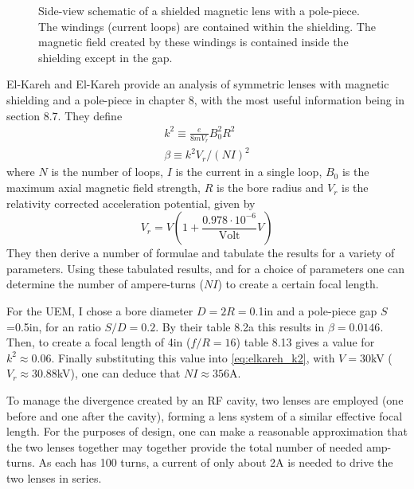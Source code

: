 \begin{figure}
  \centering
  
  \caption{
    Side-view schematic of a shielded magnetic lens with a pole-piece.
    The windings (current loops) are contained within the shielding.
    The magnetic field created by these windings is contained inside the shielding except in the gap.
  }
\end{figure}

El-Kareh and El-Kareh \cite{el-kareh_electron_1970} provide an analysis of symmetric lenses with magnetic shielding and a pole-piece in chapter 8, with the most useful information being in section 8.7.
They define
\begin{subequations}
\begin{gather}
  k^2 \equiv \frac{e}{8 m V_r} B_0^2 R^2 \\
  \beta \equiv k^2 V_r / (NI)^2 \label{eq:elkareh_k2}
\end{gather}
\end{subequations}
where $N$ is the number of loops, $I$ is the current in a single loop, $B_0$ is the maximum axial magnetic field strength, $R$ is the bore radius and $V_r$ is the relativity corrected acceleration potential, given by
\begin{equation}
  V_r = V ( 1 + \frac{0.978 \cdot 10^{-6}}{\text{Volt}} V )
\end{equation}
They then derive a number of formulae and tabulate the results for a variety of parameters.
Using these tabulated results, and for a choice of parameters one can determine the number of ampere-turns ($NI$) to create a certain focal length.

For the UEM, I chose a bore diameter $D=2R=$0.1in and a pole-piece gap $S$=0.5in, for an ratio $S/D=0.2$.
By their table 8.2a this results in $\beta=0.0146$. Then, to create a focal length of 4in ($f/R=16$) table 8.13 gives a value for $k^2 \approx 0.06$.
Finally substituting this value into \ref{eq:elkareh_k2}, with $V=30$kV ($V_r\approx30.88$kV), one can deduce that $NI\approx356$A.

To manage the divergence created by an RF cavity, two lenses are employed (one before and one after the cavity), forming a lens system of a similar effective focal length.
For the purposes of design, one can make a reasonable approximation that the two lenses together may together provide the total number of needed amp-turns.
As each has 100 turns, a current of only about 2A is needed to drive the two lenses in series.

